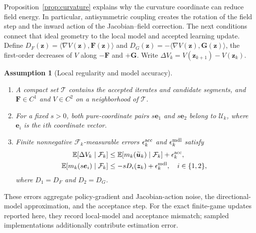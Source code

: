 \documentclass[conference]{IEEEtran}
\newcommand{\bF}{\bm{F}}
\newcommand{\bG}{\bm{G}}
\newcommand{\bz}{\bm{z}}
\newcommand{\bu}{\bm{u}}
\newcommand{\E}{\mathbb{E}}
\newtheorem{assumption}{Assumption}
\begin{document}
Proposition~\ref{prop:curvature} explains why the curvature coordinate can reduce field energy.
In particular, antisymmetric coupling creates the rotation of the field step and the inward action of the Jacobian--field correction.
The next conditions connect that ideal geometry to the local model and accepted learning update.
Define $D_F(\bz)=\langle\nabla V(\bz),\bF(\bz)\rangle$ and $D_G(\bz)=-\langle\nabla V(\bz),\bG(\bz)\rangle$, the first-order decreases of $V$ along $-\bF$ and $+\bG$.
Write $\Delta V_k=V(\bz_{k+1})-V(\bz_k)$.
\begin{assumption}[Local regularity and model accuracy]
\label{ass:model}
\begin{enumerate}
\item[(a)] A compact set $\mathcal T$ contains the accepted iterates and candidate segments, and $\bF\in C^1$ and $V\in C^2$ on a neighborhood of $\mathcal T$.
\item[(b)] For a fixed $s>0$, both pure-coordinate pairs $s\boldsymbol e_1$ and $s\boldsymbol e_2$ belong to $\mathcal U_k$, where $\boldsymbol e_i$ is the $i$th coordinate vector.
\item[(c)] Finite nonnegative $\mathcal F_k$-measurable errors $\epsilon_k^{\rm acc}$ and $\epsilon_k^{\rm mdl}$ satisfy
\[
\begin{aligned}
\E[\Delta V_k\mid\mathcal F_k]
&\leq \E[m_k(\widetilde{\bu}_k)\mid\mathcal F_k]+\epsilon_k^{\rm acc},\\
\E[m_k(s\boldsymbol e_i)\mid\mathcal F_k]
&\leq-sD_i(\bz_k)+\epsilon_k^{\rm mdl},\quad i\in\{1,2\},
\end{aligned}
\]
where $D_1=D_F$ and $D_2=D_G$.
\end{enumerate}
\end{assumption}
These errors aggregate policy-gradient and Jacobian-action noise, the directional-model approximation, and the acceptance step.
For the exact finite-game updates reported here, they record local-model and acceptance mismatch; sampled implementations additionally contribute estimation error.
\end{document}
